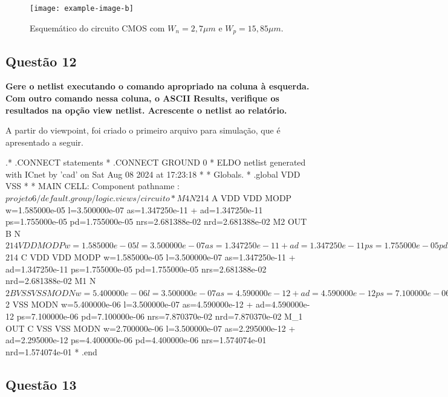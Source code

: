 \documentclass[12pt,a4paper]{article}
\begin{document}
\begin{figure}[H]
    \centering
    \texttt{[image: example-image-b]}
    \caption{Esquemático do circuito CMOS com $W_n = 2,7 \mu m$ e $W_p = 15,85 \mu m$.}
    \label{fig:cmos_schematic}
\end{figure}

\subsection*{Questão 12}

	\textbf{Gere o netlist executando o comando apropriado na coluna à esquerda. Com outro comando nessa coluna, o ASCII Results, verifique os resultados na opção view netlist. Acrescente o netlist ao relatório.}

A partir do viewpoint, foi criado o primeiro arquivo para simulação, que é apresentado a seguir.


\begin{codeblock}[title={Exemplo de Netlist}, label={lst:netlist}, listing options={language=TeX}]
.* .CONNECT statements
*
.CONNECT GROUND 0
* ELDO netlist generated with ICnet by 'cad' on Sat Aug 08 2024 at 17:23:18
*
* Globals.
*
.global VDD VSS
*
* MAIN CELL: Component pathname :
$projeto6/default.group/logic.views/circuito
*
M4 N$214 A VDD VDD MODP w=1.585000e-05 l=3.500000e-07
as=1.347250e-11
+ ad=1.347250e-11 ps=1.755000e-05 pd=1.755000e-05 nrs=2.681388e-02
nrd=2.681388e-02
M2 OUT B N$214 VDD MODP w=1.585000e-05 l=3.500000e-07
as=1.347250e-11
+ ad=1.347250e-11 ps=1.755000e-05 pd=1.755000e-05 nrs=2.681388e-02
nrd=2.681388e-02
M3 N$214 C VDD VDD MODP w=1.585000e-05 l=3.500000e-07
as=1.347250e-11
+ ad=1.347250e-11 ps=1.755000e-05 pd=1.755000e-05 nrs=2.681388e-02
nrd=2.681388e-02
M1 N$2 B VSS VSS MODN w=5.400000e-06 l=3.500000e-07 as=4.590000e-12
+ ad=4.590000e-12 ps=7.100000e-06 pd=7.100000e-06 nrs=7.870370e-02
nrd=7.870370e-02
M_2 OUT A N$2 VSS MODN w=5.400000e-06 l=3.500000e-07
as=4.590000e-12
+ ad=4.590000e-12 ps=7.100000e-06 pd=7.100000e-06 nrs=7.870370e-02
nrd=7.870370e-02
M_1 OUT C VSS VSS MODN w=2.700000e-06 l=3.500000e-07
as=2.295000e-12
+ ad=2.295000e-12 ps=4.400000e-06 pd=4.400000e-06 nrs=1.574074e-01
nrd=1.574074e-01
*
.end
\end{codeblock}

\subsection*{Questão 13}
\end{document}
